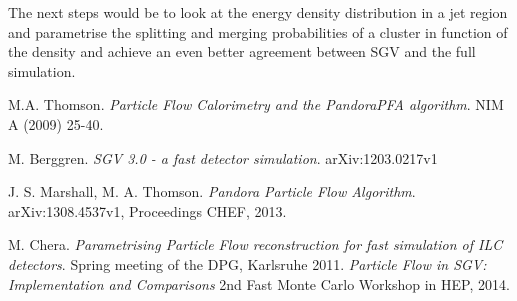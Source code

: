 \documentclass[a4paper,12pt]{article}
\begin{document}
The next steps would be to look at the energy density distribution in a jet region and parametrise the splitting and merging probabilities of a cluster in function of the density and achieve an even better agreement between SGV and the full simulation.

\medskip

\begin{thebibliography}{9}
M.A. Thomson.
\textit{Particle Flow Calorimetry and the PandoraPFA algorithm}. 
NIM A (2009) 25-40.
 
M. Berggren. 
\textit{SGV 3.0 - a fast detector simulation}.
arXiv:1203.0217v1

J. S. Marshall, M. A. Thomson. 
\textit{Pandora Particle Flow Algorithm}.
arXiv:1308.4537v1, Proceedings CHEF, 2013.

M. Chera. 
\textit{Parametrising Particle Flow reconstruction for fast simulation of ILC detectors}.
Spring meeting of the DPG, Karlsruhe 2011.
\textit{Particle Flow in SGV: Implementation and Comparisons}
2nd Fast Monte Carlo Workshop in HEP, 2014.

\end{thebibliography}
\end{document}
